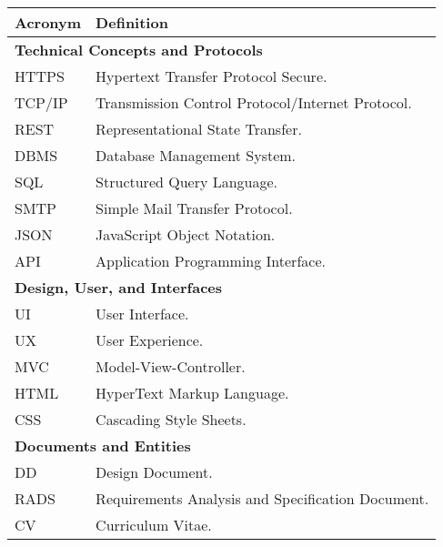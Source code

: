\begin{longtable}{|l|p{}|}
      \hline
      \textbf{Acronym} & \textbf{Definition}                               \\
      \hline \hline
      \multicolumn{2}{|l|}{\textbf{Technical Concepts and Protocols}}      \\
      \hline
      HTTPS            & Hypertext Transfer Protocol Secure.               \\
      \hline
      TCP/IP           & Transmission Control Protocol/Internet Protocol.  \\
      \hline
      REST             & Representational State Transfer.                  \\
      \hline
      DBMS             & Database Management System.                       \\
      \hline
      SQL              & Structured Query Language.                        \\
      \hline
      SMTP             & Simple Mail Transfer Protocol.                    \\
      \hline
      JSON             & JavaScript Object Notation.                       \\
      \hline
      API              & Application Programming Interface.                \\
      \hline
      \multicolumn{2}{|l|}{\textbf{Design, User, and Interfaces}}          \\
      \hline
      UI               & User Interface.                                   \\
      \hline
      UX               & User Experience.                                  \\
      \hline
      MVC              & Model-View-Controller.                            \\
      \hline
      HTML             & HyperText Markup Language.                        \\
      \hline
      CSS              & Cascading Style Sheets.                           \\
      \hline
      \multicolumn{2}{|l|}{\textbf{Documents and Entities}}                \\
      \hline
      DD               & Design Document.                                  \\
      \hline
      RADS             & Requirements Analysis and Specification Document. \\
      \hline
      CV               & Curriculum Vitae.                                 \\

\end{longtable}

